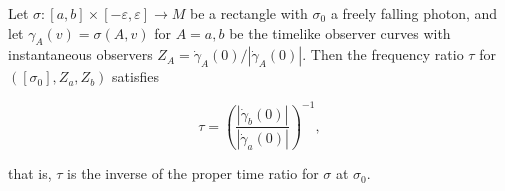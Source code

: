 Let $\sigma: [a, b] \times [-\varepsilon, \varepsilon] \to M$ be a rectangle with $\sigma_0$ a freely falling photon, and let $\gamma_A(v) = \sigma(A, v)$ for $A = a, b$ be the timelike observer curves with instantaneous observers $Z_A = \dot{\gamma}_A(0) / |\dot{\gamma}_A(0)|$. Then the frequency ratio $\tau$ for $([\sigma_0], Z_a, Z_b)$ satisfies

$$\tau = \left(\frac{|\dot{\gamma}_b(0)|}{|\dot{\gamma}_a(0)|}\right)^{-1},$$

that is, $\tau$ is the inverse of the proper time ratio for $\sigma$ at $\sigma_0$.
